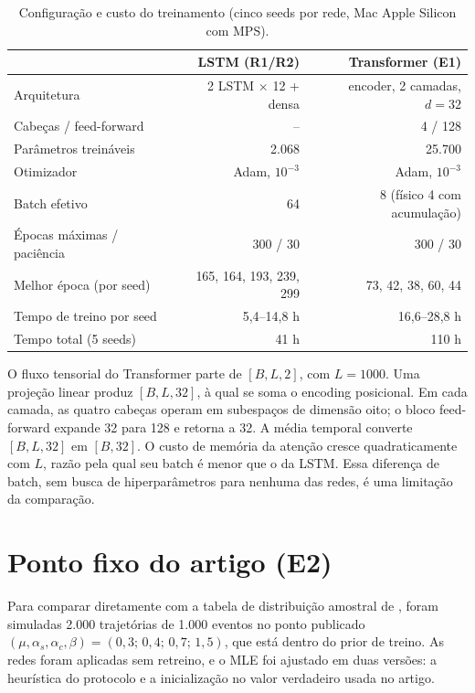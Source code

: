 \documentclass[12pt,a4paper,openany]{report}
\begin{document}
\begin{table}[htbp]
\centering
\caption{Configuração e custo do treinamento (cinco seeds por rede, Mac Apple
Silicon com MPS).}
\label{tab:treino}
\small
\begin{tabular}{lrr}
\toprule
 & LSTM (R1/R2) & Transformer (E1)\\
\midrule
Arquitetura & 2 LSTM $\times$ 12 + densa & encoder, 2 camadas, $d=32$\\
Cabeças / feed-forward & -- & 4 / 128\\
Parâmetros treináveis & 2.068 & 25.700\\
Otimizador & Adam, $10^{-3}$ & Adam, $10^{-3}$\\
Batch efetivo & 64 & 8 (físico 4 com acumulação)\\
Épocas máximas / paciência & 300 / 30 & 300 / 30\\
Melhor época (por seed) & 165, 164, 193, 239, 299 & 73, 42, 38, 60, 44\\
Tempo de treino por seed & 5,4--14,8 h & 16,6--28,8 h\\
Tempo total (5 seeds) & 41 h & 110 h\\
\bottomrule
\end{tabular}
\end{table}

O fluxo tensorial do Transformer parte de
\([B,L,2]\), com \(L=1000\). Uma projeção linear produz
\([B,L,32]\), à qual se soma o encoding posicional. Em cada camada, as quatro cabeças
operam em subespaços de dimensão oito; o bloco feed-forward expande 32 para 128 e
retorna a 32. A média temporal converte \([B,L,32]\) em \([B,32]\). O custo de memória
da atenção cresce quadraticamente com \(L\), razão pela qual seu batch é menor que o
da LSTM. Essa diferença de batch, sem busca de hiperparâmetros para nenhuma das redes,
é uma limitação da comparação.

\section{Ponto fixo do artigo (E2)}

Para comparar diretamente com a tabela de distribuição amostral de \citet{lee2023},
foram simuladas 2.000 trajetórias de 1.000 eventos no ponto publicado
\((\mu,\alpha_s,\alpha_c,\beta)=(0{,}3;\,0{,}4;\,0{,}7;\,1{,}5)\), que está dentro do
prior de treino. As redes foram aplicadas sem retreino, e o MLE foi ajustado em duas
versões: a heurística do protocolo e a inicialização no valor verdadeiro usada no
artigo.
\end{document}
